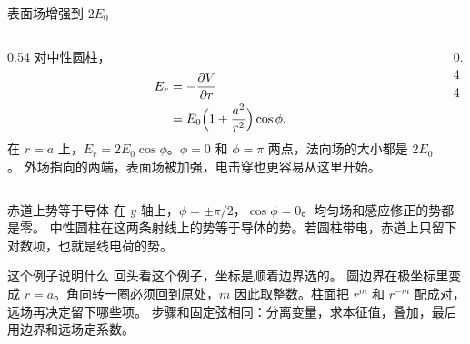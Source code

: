 \documentclass[fontset=windows, chinese, 10pt, xcolor=dvipsnames]{beamer}
\begin{document}
\begin{frame}{表面场增强到 $2E_0$}
  \begin{columns}[c]
    \begin{column}{0.54\textwidth}
      对中性圆柱，
      \begin{align*}
        E_r&=-\frac{\partial V}{\partial r}\\
        &=E_0\Bigl(1+\frac{a^2}{r^2}\Bigr)\cos\phi.
      \end{align*}
      在 $r=a$ 上，$E_r=2E_0\cos\phi$。$\phi=0$ 和 $\phi=\pi$ 两点，法向场的大小都是 $2E_0$。
      \vspace{0.35em}
      外场指向的两端，表面场被加强，电击穿也更容易从这里开始。
    \end{column}
    \begin{column}{0.44\textwidth}
      \centering
      \scalebox{0.78}{}
    \end{column}
  \end{columns}
\end{frame}

\begin{frame}{赤道上势等于导体}
  在 $y$ 轴上，$\phi=\pm\pi/2$，$\cos\phi=0$。均匀场和感应修正的势都是零。
  \vspace{0.3em}
  中性圆柱在这两条射线上的势等于导体的势。若圆柱带电，赤道上只留下对数项，也就是线电荷的势。
\end{frame}

\begin{frame}{这个例子说明什么}
  回头看这个例子，坐标是顺着边界选的。
  圆边界在极坐标里变成 $r=a$。角向转一圈必须回到原处，$m$ 因此取整数。柱面把 $r^{m}$ 和 $r^{-m}$ 配成对，远场再决定留下哪些项。
  \vspace{0.35em}
  步骤和固定弦相同：分离变量，求本征值，叠加，最后用边界和远场定系数。
\end{frame}


\end{document}
